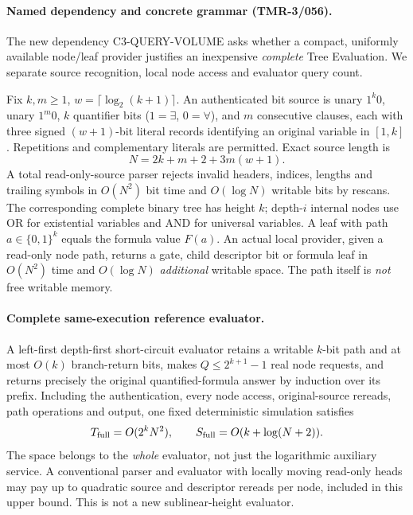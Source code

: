 \documentclass[11pt]{article}
\begin{document}
\paragraph{Named dependency and concrete grammar (TMR-3/056).}
The new dependency \textsf{C3-QUERY-VOLUME} asks whether a compact,
uniformly available node/leaf provider justifies an inexpensive
\emph{complete} Tree Evaluation. We separate source recognition,
local node access and evaluator query count.

Fix $k,m\ge1$, $w=\lceil\log_2(k+1)\rceil$. An authenticated bit source
is unary $1^k0$, unary $1^m0$, $k$ quantifier bits
($1=\exists$, $0=\forall$), and $m$ consecutive clauses, each with
three signed $(w+1)$-bit literal records identifying an original
variable in $[1,k]$. Repetitions and complementary literals are
permitted. Exact source length is
\[
  N=2k+m+2+3m(w+1).
\]
A total read-only-source parser rejects invalid headers, indices,
lengths and trailing symbols in $O(N^2)$ bit time and $O(\log N)$
writable bits by rescans. The corresponding complete binary tree
has height $k$; depth-$i$ internal nodes use OR for existential
variables and AND for universal variables. A leaf with path
$a\in\{0,1\}^k$ equals the formula value $F(a)$.
An actual local provider, given a read-only node path, returns a
gate, child descriptor bit or formula leaf in $O(N^2)$ time
and $O(\log N)$ \emph{additional} writable space.
The path itself is \emph{not} free writable memory.

\paragraph{Complete same-execution reference evaluator.}
A left-first depth-first short-circuit evaluator retains a writable
$k$-bit path and at most $O(k)$ branch-return bits, makes
$Q\le2^{k+1}-1$ real node requests, and returns precisely the
original quantified-formula answer by induction over its prefix.
Including the authentication, every node access, original-source
rereads, path operations and output, one fixed deterministic
simulation satisfies
\[
  T_{\rm full}=O(2^kN^2),\qquad
  S_{\rm full}=O(k+\log(N+2)).
\]
The space belongs to the \emph{whole} evaluator, not just the
logarithmic auxiliary service. A conventional parser and evaluator
with locally moving read-only heads may pay up to quadratic source
and descriptor rereads per node, included in this upper bound.
This is not a new sublinear-height evaluator.
\end{document}
